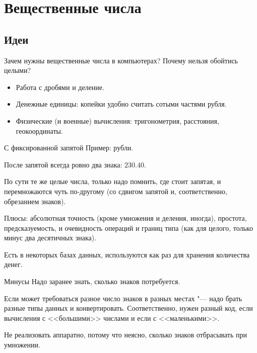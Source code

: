 \section{Вещественные числа}
\subsection{Идеи}

\begin{frame}
\end{frame}

\begin{frame}
	Зачем нужны вещественные числа в компьютерах?
	Почему нельзя обойтись целыми?

	\pause
	\begin{itemize}
		\item Работа с дробями и деление.
		\item Денежные единицы: копейки удобно считать сотыми частями рубля.
		\item Физические (и военные) вычисления: тригонометрия, расстояния, геокоординаты.
	\end{itemize}
\end{frame}

\begin{frame}{С фиксированной запятой}
	Пример: рубли.
	
	После запятой всегда ровно два знака: $230.40$.

	По сути те же целые числа, только надо помнить, где стоит запятая, и перемножаются чуть по-другому (со сдвигом запятой и, соответственно, обрезанием знаков).

	Плюсы: абсолютная точность (кроме умножения и деления, иногда), простота, предсказуемость, и очевидность операций и границ типа (как для целого, только минус два десятичных знака).

	Есть в некоторых базах данных, используются как раз для хранения количества денег.
\end{frame}

\begin{frame}{Минусы}
	Надо заранее знать, сколько знаков потребуется.
	
	Если может требоваться разное число знаков в разных местах "--- надо брать разные типы данных и конвертировать.
	Соответственно, нужен разный код, если вычисления с <<большими>> числами и если с <<маленькими>>.

	Не реализовать аппаратно, потому что неясно, сколько знаков отбрасывать при умножении.
\end{frame}

